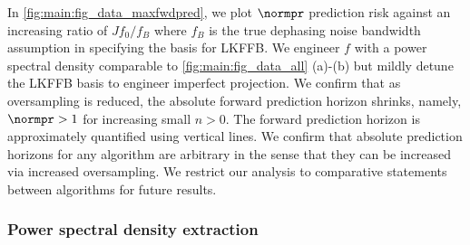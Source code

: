 In \cref{fig:main:fig_data_maxfwdpred}, we plot $\normpr$ prediction risk against an increasing ratio of $Jf_0 / f_B$ where $f_B$ is the true dephasing noise bandwidth assumption in specifying the basis for LKFFB. We engineer $f$ with a power spectral density comparable to \cref{fig:main:fig_data_all} (a)-(b) but mildly detune the LKFFB basis to engineer imperfect projection. We confirm that as oversampling is reduced, the absolute forward prediction horizon shrinks, namely, $\normpr > 1 $ for increasing small $n>0$. The forward prediction horizon is approximately quantified using vertical lines. We confirm that absolute prediction horizons for any algorithm are arbitrary in the sense that they can be increased via increased oversampling. We restrict our analysis to comparative statements between algorithms for future results. 

\subsubsection{Power spectral density extraction}

